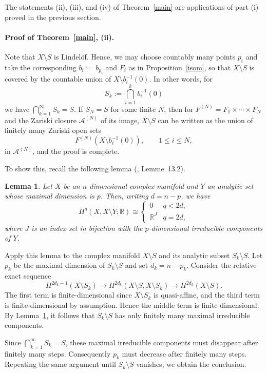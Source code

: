 \documentclass[a4paper, 12pt]{article}
\newcommand{\cA}{\mathcal{A}}
\newtheorem{lem}[thm]{Lemma}
\begin{document}
The statements (ii), (iii), and (iv) of Theorem~\ref{main} are applications of part (i) proved in the previous section.

\paragraph{Proof of Theorem~\ref{main}, (ii).}
Note that $X\setminus S$ is Lindel\"of. Hence, we may choose countably many points $p_i$ and take the corresponding $b_i:=b_{p_i}$ and $F_i$ as in Proposition~\ref{isom}, so that $X\setminus S$ is covered by the countable union of $X\setminus b_i^{-1}(0)$. In other words, for
\[
S_k:=\bigcap_{i=1}^k b_i^{-1}(0)
\]
we have $\bigcap_{k=1}^\infty S_k=S$. If $S_N=S$ for some finite $N$, then for $F^{(N)}=F_1\times\cdots\times F_N$ and the Zariski closure $\cA^{(N)}$ of its image, $X\setminus S$ can be written as the union of finitely many Zariski open sets
\[
F^{(N)}(X\setminus b_i^{-1}(0)),\qquad 1\le i\le N,
\]
in $\cA^{(N)}$, and the proof is complete.

To show this, recall the following lemma (\cite{D85}, Lemme~13.2).

\begin{lem}\label{irred}
Let $X$ be an $n$-dimensional complex manifold and $Y$ an analytic set whose maximal dimension is $p$. Then, writing $d=n-p$, we have
\[
H^q(X,X\setminus Y;\mathbb{R})\cong
\begin{cases}
0 & q<2d,\\
\mathbb{R}^J & q=2d,
\end{cases}
\]
where $J$ is an index set in bijection with the $p$-dimensional irreducible components of $Y$.
\end{lem}

Apply this lemma to the complex manifold $X\setminus S$ and its analytic subset $S_k\setminus S$. Let $p_k$ be the maximal dimension of $S_k\setminus S$ and set $d_k=n-p_k$. Consider the relative exact sequence
\[
H^{2d_k-1}(X\setminus S_k)\to H^{2d_k}(X\setminus S,X\setminus S_k)\to H^{2d_k}(X\setminus S).
\]
The first term is finite-dimensional since $X\setminus S_k$ is quasi-affine, and the third term is finite-dimensional by assumption. Hence the middle term is finite-dimensional. By Lemma~\ref{irred}, it follows that $S_k\setminus S$ has only finitely many maximal irreducible components.

Since $\bigcap_{k=1}^\infty S_k=S$, these maximal irreducible components must disappear after finitely many steps. Consequently $p_k$ must decrease after finitely many steps. Repeating the same argument until $S_k\setminus S$ vanishes, we obtain the conclusion.
\end{document}

